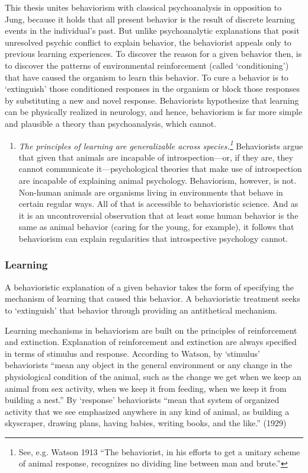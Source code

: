 This thesis unites behaviorism with classical psychoanalysis in opposition to Jung, because it holds that all present behavior is the result of discrete learning events in the individual's past. But unlike psychoanalytic explanations that posit unresolved psychic conflict to explain behavior, the behaviorist appeals only to previous learning experiences. To discover the reason for a given behavior then, is to discover the patterns of environmental reinforcement (called `conditioning') that have caused the organism to learn this behavior. To cure a behavior is to `extinguish' those conditioned responses in the organism or block those responses by substituting a new and novel response. Behaviorists hypothesize that learning can be physically realized in neurology, and hence, behaviorism is far more simple and plausible a theory than psychoanalysis, which cannot.

\begin{enumerate}
\item \emph{The principles of learning are generalizable across species.\footnote{See, e.g. Watson 1913 ``The behaviorist, in his efforts to get a unitary scheme of animal response, recognizes no dividing line between man and brute.''}} Behaviorists argue that given that animals are incapable of introspection---or, if they are, they cannot communicate it---psychological theories that make use of introspection are incapable of explaining animal psychology. Behaviorism, however, is not. Non-human animals are organisms living in environments that behave in certain regular ways. All of that is accessible to behavioristic science. And as it is an uncontroversial observation that at least some human behavior is the same as animal behavior (caring for the young, for example), it follows that behaviorism can explain regularities that introspective psychology cannot.

\end{enumerate}

\subsubsection{Learning}
\label{learning}

A behavioristic explanation of a given behavior takes the form of specifying the mechanism of learning that caused this behavior. A behavioristic treatment seeks to `extinguish' that behavior through providing an antithetical mechanism.

Learning mechanisms in behaviorism are built on the principles of reinforcement and extinction. Explanation of reinforcement and extinction are always specified in terms of stimulus and response. According to Watson, by `stimulus' behaviorists ``mean any object in the general environment or any change in the physiological condition of the animal, such as the change we get when we keep an animal from sex activity, when we keep it from feeding, when we keep it from building a nest.'' By `response' behaviorists ``mean that system of organized activity that we see emphasized anywhere in any kind of animal, as building a skyscraper, drawing plans, having babies, writing books, and the like.'' (1929)

